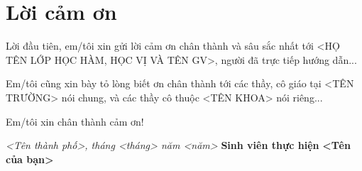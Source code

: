 
\chapter*{Lời cảm ơn}

Lời đầu tiên, em/tôi xin gửi lời cảm ơn chân thành và sâu sắc nhất tới <HỌ TÊN LỚP HỌC HÀM, HỌC VỊ VÀ TÊN GV>, người đã trực tiếp hướng dẫn...

Em/tôi cũng xin bày tỏ lòng biết ơn chân thành tới các thầy, cô giáo tại <TÊN TRƯỜNG> nói chung, và các thầy cô thuộc <TÊN KHOA> nói riêng...

Em/tôi xin chân thành cảm ơn!

\vspace{1cm}
\begin{flushright}
    \textit{<Tên thành phố>, tháng <tháng> năm <năm>} \newline
    \textbf{Sinh viên thực hiện} \newline
    \vspace{1.5cm}
    \textbf{<Tên của bạn>}
\end{flushright}
